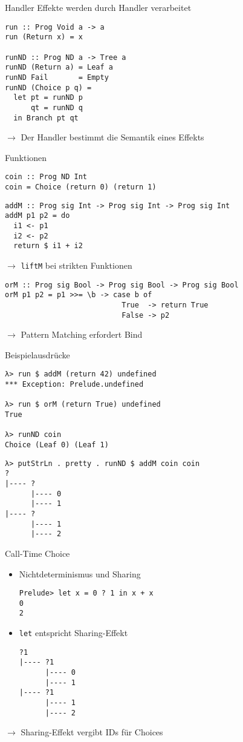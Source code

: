 \documentclass{beamer}
\newcommand{\haskellinline}[1]{\texttt{#1}}
\begin{document}
\begin{frame}[fragile]{Handler}
Effekte werden durch \alert{Handler} verarbeitet
\begin{verbatim}
run :: Prog Void a -> a
run (Return x) = x

runND :: Prog ND a -> Tree a
runND (Return a) = Leaf a
runND Fail       = Empty
runND (Choice p q) =
  let pt = runND p
      qt = runND q
  in Branch pt qt
\end{verbatim}
$\rightarrow$ Der Handler bestimmt die \alert{Semantik} eines Effekts
\end{frame}

\begin{frame}[fragile]{Funktionen}
\begin{verbatim}
coin :: Prog ND Int
coin = Choice (return 0) (return 1)
\end{verbatim}
\pause
\begin{verbatim}
addM :: Prog sig Int -> Prog sig Int -> Prog sig Int
addM p1 p2 = do
  i1 <- p1
  i2 <- p2
  return $ i1 + i2
\end{verbatim}
$\rightarrow$ \haskellinline{liftM} bei strikten Funktionen
\pause
\begin{verbatim}
orM :: Prog sig Bool -> Prog sig Bool -> Prog sig Bool
orM p1 p2 = p1 >>= \b -> case b of
                           True  -> return True
                           False -> p2
\end{verbatim}
$\rightarrow$ Pattern Matching erfordert Bind
\end{frame}

\begin{frame}[fragile]{Beispielausdrücke}
\begin{verbatim}
λ> run $ addM (return 42) undefined
*** Exception: Prelude.undefined

λ> run $ orM (return True) undefined
True

λ> runND coin
Choice (Leaf 0) (Leaf 1)
\end{verbatim}
\pause
\begin{verbatim}
λ> putStrLn . pretty . runND $ addM coin coin
?
|---- ?
      |---- 0
      |---- 1
|---- ?
      |---- 1
      |---- 2
\end{verbatim}
\end{frame}

\begin{frame}[fragile]{Call-Time Choice}
\begin{itemize}
\item Nichtdeterminismus und \alert{Sharing}
\begin{verbatim}
Prelude> let x = 0 ? 1 in x + x
0
2
\end{verbatim}
\item \haskellinline{let} entspricht Sharing-Effekt
\begin{verbatim}
?1
|---- ?1
      |---- 0
      |---- 1
|---- ?1
      |---- 1
      |---- 2
\end{verbatim}
\end{itemize}
$\rightarrow$ Sharing-Effekt vergibt \alert{IDs} für Choices
\end{frame}
\end{document}
